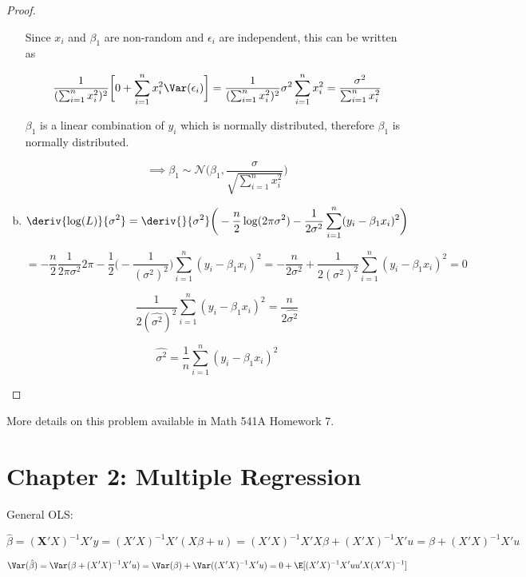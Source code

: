 \begin{proof}
\begin{enumerate}[(a)]
Since \(x_i\) and \(\beta_1\) are non-random and \(\epsilon_i\) are independent, this can be written as

\[
\frac{1}{(\sum_{i=1}^n x_i^2)^2} \bigg[0 + \sum_{i=1}^n x_i^2 \Var(\epsilon_i)  \bigg] =  \frac{1}{(\sum_{i=1}^n x_i^2)^2} \sigma^2 \sum_{i=1}^n x_i^2 = \frac{\sigma^2}{\sum_{i=1}^n x_i^2}
\]

\(\beta_1\) is a linear combination of \(y_i\) which is normally distributed, therefore \(\beta_1\) is normally distributed.

\[
\implies
\beta_1 \sim\mathcal{N}\bigg(\beta_1, \frac{\sigma}{\sqrt{\sum_{i=1}^n x_i^2}}\bigg)
\]

\item

\[
\deriv{\log(L)}{\sigma^2} = \deriv{}{\sigma^2} \bigg(  -\frac{n}{2} \log(2 \pi \sigma^2) -\frac{1}{2\sigma^2} \sum_{i=1}^n (y_i - \beta_1 x_i)^2  \bigg)
\]

\[
= -\frac{n}{2} \frac{1}{2 \pi \sigma^2} 2 \pi - \frac{1}{2} \bigg(- \frac{1}{(\sigma^2)^2} \bigg) \sum_{i=1}^n (y_i - \beta_1 x_i)^2 = -\frac{n}{2\sigma^2} + \frac{1}{2(\sigma^2)^2} \sum_{i=1}^n (y_i - \beta_1 x_i)^2 = 0
\]

\[
\frac{1}{2(\hat{\sigma^2})^2} \sum_{i=1}^n (y_i - \beta_1 x_i)^2  = \frac{n}{2\hat{\sigma^2}}
\]

\[
\hat{\sigma^2} = \frac{1}{n}\sum_{i=1}^n (y_i - \beta_1 x_i)^2 
\]

\end{enumerate}

\end{proof}

\begin{remark}More details on this problem available in Math 541A Homework 7.

\end{remark}

\section{Chapter 2: Multiple Regression}

General OLS:

\[
\hat{\beta} = (\boldsymbol{X}'X)^{-1}X'y = (X'X)^{-1}X'(X\beta + u) = (X'X)^{-1}X'X\beta + (X'X)^{-1}X'u  = \beta + (X'X)^{-1}X'u
\]

\[
\Var(\hat{\beta}) = \Var(\beta + (X'X)^{-1}X'u) = \Var(\beta) + \Var((X'X)^{-1}X' u) = 0 + \E[(X'X)^{-1}X' uu' X (X'X)^{-1} ] 
\]

